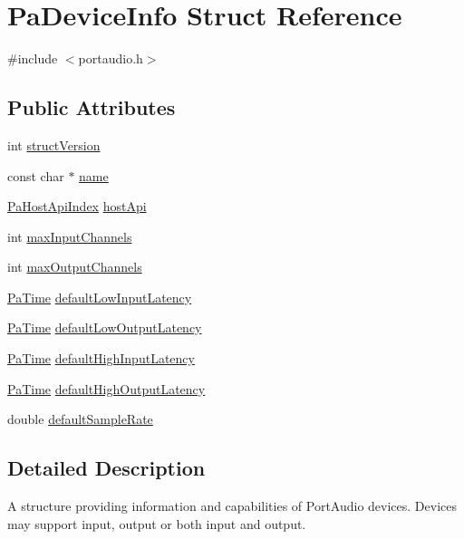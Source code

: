 \hypertarget{struct_pa_device_info}{}\section{Pa\+Device\+Info Struct Reference}
\label{struct_pa_device_info}


{\ttfamily \#include $<$portaudio.\+h$>$}

\subsection*{Public Attributes}
\begin{DoxyCompactItemize}
\item 
int \hyperlink{struct_pa_device_info_a2d726add4cd2af78a94c052b3a7df568}{struct\+Version}
\item 
const char $\ast$ \hyperlink{struct_pa_device_info_a1bc26d68f1d89472ae67eaa49a542aea}{name}
\item 
\hyperlink{portaudio_8h_aeef6da084c57c70aa94be97411e19930}{Pa\+Host\+Api\+Index} \hyperlink{struct_pa_device_info_afe741e4d185069577f7e74b78fdef5a4}{host\+Api}
\item 
int \hyperlink{struct_pa_device_info_ad0baeeb2b6ceaf7fc9bb76109a7555e9}{max\+Input\+Channels}
\item 
int \hyperlink{struct_pa_device_info_a48f908b21e8a11fdf0a88132b18fe7b0}{max\+Output\+Channels}
\item 
\hyperlink{portaudio_8h_af17a7e6d0471a23071acf8dbd7bbe4bd}{Pa\+Time} \hyperlink{struct_pa_device_info_aad6629064b8c7cf043d237ea0a5cc534}{default\+Low\+Input\+Latency}
\item 
\hyperlink{portaudio_8h_af17a7e6d0471a23071acf8dbd7bbe4bd}{Pa\+Time} \hyperlink{struct_pa_device_info_a89e60515505eea8d668ede3a26a19ac6}{default\+Low\+Output\+Latency}
\item 
\hyperlink{portaudio_8h_af17a7e6d0471a23071acf8dbd7bbe4bd}{Pa\+Time} \hyperlink{struct_pa_device_info_a4214826038fcaf374beb9816024e6c9f}{default\+High\+Input\+Latency}
\item 
\hyperlink{portaudio_8h_af17a7e6d0471a23071acf8dbd7bbe4bd}{Pa\+Time} \hyperlink{struct_pa_device_info_a2a43dbc2b158806a937065bda037070e}{default\+High\+Output\+Latency}
\item 
double \hyperlink{struct_pa_device_info_a68f435353bfe1a4c9b632203a9afcacb}{default\+Sample\+Rate}
\end{DoxyCompactItemize}


\subsection{Detailed Description}
A structure providing information and capabilities of Port\+Audio devices. Devices may support input, output or both input and output. 

